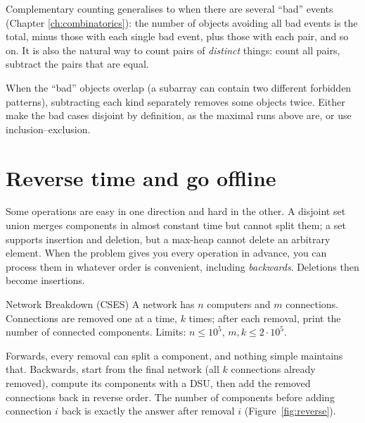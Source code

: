 Complementary counting generalises to  when there are several ``bad'' events (Chapter
\ref{ch:combinatorics}): the number of objects avoiding all bad events is the total, minus those with each single bad
event, plus those with each pair, and so on. It is also the natural way to count pairs of \emph{distinct} things: count
all pairs, subtract the pairs that are equal.

\begin{pitfall}
When the ``bad'' objects overlap (a subarray can contain two different forbidden patterns), subtracting each kind separately
removes some objects twice. Either make the bad cases disjoint by definition, as the maximal runs above are, or use
inclusion--exclusion.
\end{pitfall}

\section[Reverse time and go offline]{Reverse time and go offline \hfill \gold}\label{sec:reverse}

Some operations are easy in one direction and hard in the other. A disjoint set union merges components in almost constant
time but cannot split them; a set supports insertion and deletion, but a max-heap cannot delete an arbitrary element. When
the problem gives you every operation in advance, you can process them in whatever order is convenient, including
\emph{backwards}. Deletions then become insertions.

\begin{problem}{Network Breakdown (CSES)}
A network has $n$ computers and $m$ connections. Connections are removed one at a time, $k$ times; after each removal, print
the number of connected components. Limits: $n \le 10^5$, $m, k \le 2 \cdot 10^5$.
\end{problem}

Forwards, every removal can split a component, and nothing simple maintains that. Backwards, start from the final network
(all $k$ connections already removed), compute its components with a DSU, then add the removed connections back in reverse
order. The number of components before adding connection $i$ back is exactly the answer after removal $i$
(Figure~\ref{fig:reverse}).


